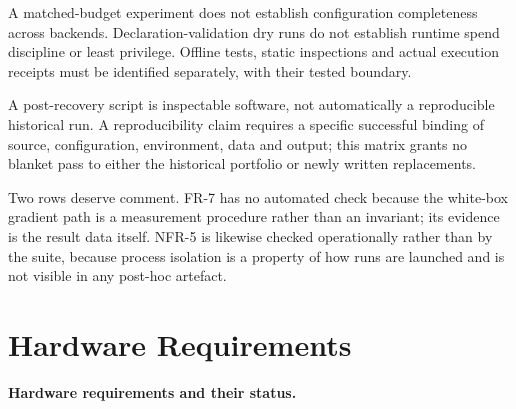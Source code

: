 \documentclass[12pt,a4paper]{report}
\begin{document}
A matched-budget experiment does not establish configuration
completeness across backends. Declaration-validation dry runs do not
establish runtime spend discipline or least privilege. Offline tests,
static inspections and actual execution receipts must be identified
separately, with their tested boundary.

A post-recovery script is inspectable software, not automatically a
reproducible historical run. A reproducibility claim requires a specific
successful binding of source, configuration, environment, data and
output; this matrix grants no blanket pass to either the historical
portfolio or newly written replacements.

Two rows deserve comment. FR-7 has no automated check because the
white-box gradient path is a measurement procedure rather than an
invariant; its evidence is the result data itself. NFR-5 is likewise
checked operationally rather than by the suite, because process
isolation is a property of how runs are launched and is not visible in
any post-hoc artefact.

\section{Hardware Requirements}\label{hardware-requirements}

\textbf{Hardware requirements and their status.}
\end{document}
